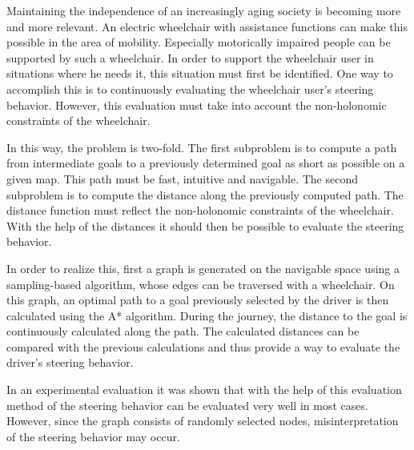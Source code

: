 



Maintaining the independence of an increasingly aging society is becoming more and more relevant. An electric wheelchair with assistance functions can make this possible in the area of mobility. Especially motorically impaired people can be supported by such a wheelchair. In order to support the wheelchair user in situations where he needs it, this situation must first be identified. One way to accomplish this is to continuously evaluating the wheelchair user's steering behavior. However, this evaluation must take into account the non-holonomic constraints of the wheelchair.

In this way, the problem is two-fold. The first subproblem is to compute a path from intermediate goals to a previously determined goal as short as possible on a given map. This path must be fast, intuitive and navigable. The second subproblem is to compute the distance along the previously computed path. The distance function must reflect the non-holonomic constraints of the wheelchair. With the help of the distances it should then be possible to evaluate the steering behavior.

In order to realize this, first a graph is generated on the navigable space using a sampling-based algorithm, whose edges can be traversed with a wheelchair. On this graph, an optimal path to a goal previously selected by the driver is then calculated using the A* algorithm. During the journey, the distance to the goal is continuously calculated along the path. The calculated distances can be compared with the previous calculations and thus provide a way to evaluate the driver's steering behavior.

In an experimental evaluation it was shown that with the help of this evaluation method of the steering behavior can be evaluated very well in most cases. However, since the graph consists of randomly selected nodes, misinterpretation of the steering behavior may occur.



